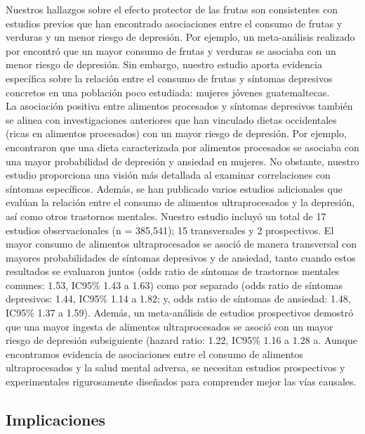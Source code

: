 \documentclass[jou]{apa7}
\begin{document}
	Nuestros hallazgos sobre el efecto protector de las frutas son
	consistentes con estudios previos que han encontrado asociaciones entre
	el consumo de frutas y verduras y un menor riesgo de depresión. Por
	ejemplo, un meta-análisis realizado por \parencite{liuFruitVegetableConsumption2016} encontró que
	un mayor consumo de frutas y verduras se asociaba con un menor riesgo de
	depresión. Sin embargo, nuestro estudio aporta evidencia específica
	sobre la relación entre el consumo de frutas y síntomas depresivos
	concretos en una población poco estudiada: mujeres jóvenes
	guatemaltecas.\\

	La asociación positiva entre alimentos procesados y síntomas depresivos también se alinea con investigaciones anteriores que han vinculado dietas occidentales (ricas en alimentos procesados) con un mayor riesgo de depresión. Por ejemplo, \parencite{laneUltraProcessedFoodConsumption2022} encontraron que una dieta caracterizada por alimentos procesados se asociaba con una mayor probabilidad de depresión y ansiedad en mujeres. No obstante, nuestro estudio proporciona una visión más detallada al examinar correlaciones con síntomas específicos. Además, se han publicado varios estudios adicionales que evalúan la relación entre el consumo de alimentos ultraprocesados y la depresión, así como otros trastornos mentales. Nuestro estudio incluyó un total de 17 estudios observacionales (n = 385,541); 15 transversales y 2 prospectivos. El mayor consumo de alimentos ultraprocesados se asoció de manera transversal con mayores probabilidades de síntomas depresivos y de ansiedad, tanto cuando estos resultados se evaluaron juntos (odds ratio de síntomas de trastornos mentales comunes: 1.53, IC95\% 1.43 a 1.63) como por separado (odds ratio de síntomas depresivos: 1.44, IC95\% 1.14 a 1.82; y, odds ratio de síntomas de ansiedad: 1.48, IC95\% 1.37 a 1.59). Además, un meta-análisis de estudios prospectivos demostró que una mayor ingesta de alimentos ultraprocesados se asoció con un mayor riesgo de depresión subsiguiente (hazard ratio: 1.22, IC95\% 1.16 a 1.28 a. Aunque encontramos evidencia de asociaciones entre el consumo de alimentos ultraprocesados y la salud mental adversa, se necesitan estudios prospectivos y experimentales rigurosamente diseñados para comprender mejor las vías causales.

	\subsection{Implicaciones}\label{implicaciones}
\end{document}

